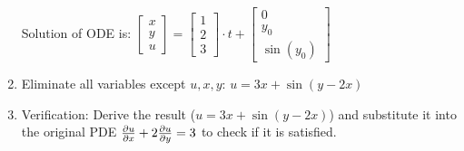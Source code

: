 \begin{enumerate}
	Solution of ODE is: $\begin{bmatrix}x\\y\\u\end{bmatrix}=\begin{bmatrix}1\\2\\3\end{bmatrix}\cdot t+ \begin{bmatrix}0\\y_0\\\sin(y_0)\end{bmatrix}$
	\item Eliminate all variables except $u,x,y$: $u=3x+\sin(y-2x)$
	\item Verification:
	Derive the result ($u=3x+\sin(y-2x)$) and substitute it into the original PDE $\frac{\partial u}{\partial x}+2\frac{\partial u}{\partial y}=3$ to check if it is satisfied.
\end{enumerate}
